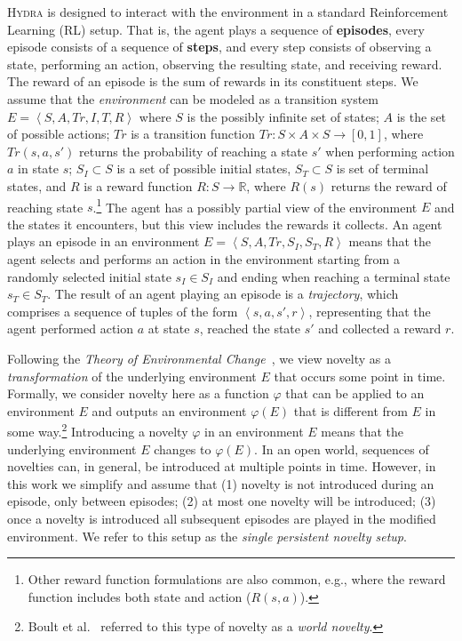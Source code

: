 \documentclass[sigconf]{aamas}
\newcommand{\tuple}[1]{\ensuremath{\left \langle #1 \right \rangle }}
\newcommand{\reals}{\ensuremath{\mathbb{R}}}
\newcommand{\hydra}{\textsc{Hydra}\xspace} %
\begin{document}
\hydra is designed to interact with the environment in a standard Reinforcement Learning (RL) setup. 
That is, the agent plays a sequence of \textbf{episodes}, 
every episode consists of a sequence of \textbf{steps},
and every step consists of observing a state, 
performing an action, 
observing the resulting state, 
and receiving reward. 
The reward of an episode is the sum of rewards in its constituent steps.
We assume that the \emph{environment} can be modeled as a transition system $E=\tuple{S, A, Tr, I, T, R}$
where $S$ is the possibly infinite set of states;
$A$ is the set of possible actions; 
$Tr$ is a transition function $Tr: S\times A \times S \rightarrow [0,1]$, 
where $Tr(s,a,s')$ returns the probability of reaching a state $s'$ when performing action $a$ in state $s$;
$S_I\subset S$ is a set of possible initial states, 
$S_T\subset S$ is set of terminal states, 
and $R$ is a reward function $R: S\rightarrow \reals$, where $R(s)$ returns the reward of reaching state $s$.\footnote{Other reward function formulations are also common, e.g., where the reward function includes both state and action ($R(s,a)$).}
The agent has a possibly partial view of the environment $E$ and the states it encounters, 
but this view includes the rewards it collects. 
An agent plays an episode in an environment $E=\tuple{S, A, Tr, S_I, S_T, R}$ 
means that the agent selects and performs an action in the environment starting 
from a randomly selected initial state $s_I\in S_I$ and ending when reaching a terminal state $s_T\in S_T$. 
The result of an agent playing an episode is a \emph{trajectory}, which comprises a sequence of tuples of the form $\tuple{s, a, s',r}$, representing that the agent performed action $a$ at state $s$, reached the state $s'$ and collected a reward $r$. 



Following the \emph{Theory of Environmental Change}~\cite{langley2020open}, 
we view novelty as a \emph{transformation} of the underlying environment $E$ that occurs some point in time.
Formally, we consider novelty here as a function $\varphi$ that can be applied to an environment $E$ and outputs an environment $\varphi(E)$ 
that is different from $E$ in some way.\footnote{Boult et al.~\cite{boult2021towards} referred to this type of novelty as a \emph{world novelty}.}
Introducing a novelty $\varphi$ in an environment $E$ means that the underlying environment $E$ changes to $\varphi(E)$. 
In an open world, sequences of novelties can, in general, be introduced at multiple points in time. 
However, in this work we simplify and assume that 
(1) novelty is not introduced during an episode, only between episodes;
(2) at most one novelty will be introduced;
(3) once a novelty is introduced all subsequent episodes are played in the modified environment. 
We refer to this setup as the \emph{single persistent novelty setup}. 
\end{document}
